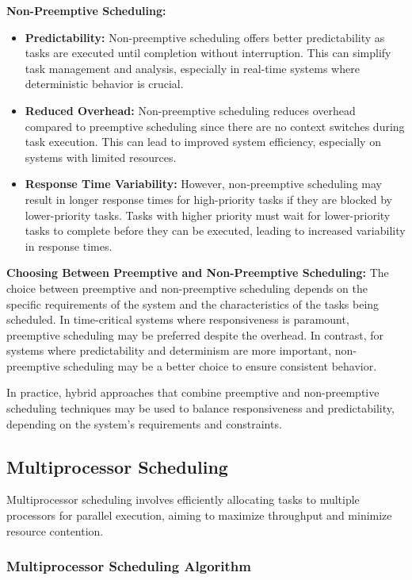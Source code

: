 \documentclass[12pt]{book} %
\begin{document}
\textbf{Non-Preemptive Scheduling:}
\begin{itemize}
    \item \textbf{Predictability:} Non-preemptive scheduling offers better predictability as tasks are executed until completion without interruption. This can simplify task management and analysis, especially in real-time systems where deterministic behavior is crucial.
    \item \textbf{Reduced Overhead:} Non-preemptive scheduling reduces overhead compared to preemptive scheduling since there are no context switches during task execution. This can lead to improved system efficiency, especially on systems with limited resources.
    \item \textbf{Response Time Variability:} However, non-preemptive scheduling may result in longer response times for high-priority tasks if they are blocked by lower-priority tasks. Tasks with higher priority must wait for lower-priority tasks to complete before they can be executed, leading to increased variability in response times.
\end{itemize}

\textbf{Choosing Between Preemptive and Non-Preemptive Scheduling:}
The choice between preemptive and non-preemptive scheduling depends on the specific requirements of the system and the characteristics of the tasks being scheduled. In time-critical systems where responsiveness is paramount, preemptive scheduling may be preferred despite the overhead. In contrast, for systems where predictability and determinism are more important, non-preemptive scheduling may be a better choice to ensure consistent behavior.

In practice, hybrid approaches that combine preemptive and non-preemptive scheduling techniques may be used to balance responsiveness and predictability, depending on the system's requirements and constraints.


\subsection{Multiprocessor Scheduling}

Multiprocessor scheduling involves efficiently allocating tasks to multiple processors for parallel execution, aiming to maximize throughput and minimize resource contention.

\subsubsection{Multiprocessor Scheduling Algorithm}
\end{document}
